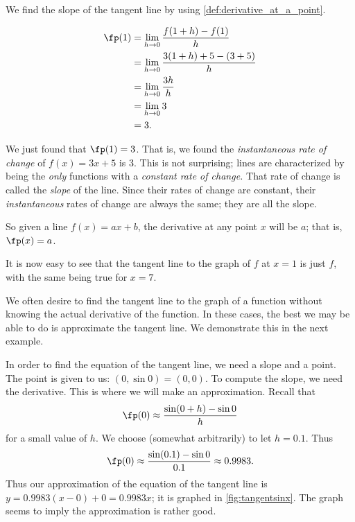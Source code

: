 {We find the slope of the tangent line by using \autoref{def:derivative_at_a_point}.

	\begin{align*}
	\fp(1) &=	\lim_{h\to 0}\frac{f(1+h)-f(1)}{h} \\
					&=	\lim_{h\to 0} \frac{3(1+h)+5 - (3+5)}{h}\\
					&=	\lim_{h\to 0} \frac{3h}{h}\\
					&=	\lim_{h\to 0} 3\\
					&= 3.
	\end{align*}
	
We just found that $\fp(1) = 3$. That is, we found the \textit{instantaneous rate of change} of $f(x) = 3x+5$ is $3$. This is not surprising; lines are characterized by being the \textit{only} functions with a \textit{constant rate of change.} That rate of change is called the \textit{slope} of the line. Since their rates of change are constant, their \textit{instantaneous} rates of  change are always the same; they are all the slope.

So given a line $f(x) = ax+b$, the derivative at any point $x$ will be $a$; that is, $\fp(x) = a$. 

It is now easy to see that the tangent line to the graph of $f$ at $x=1$ is just $f$, with the same being true for $x=7$.}

We often desire to find the tangent line to the graph of a function without knowing the actual derivative of the function. In these cases, the best we may be able to do is approximate the tangent line. We demonstrate this in the next example.\\

{In order to find the equation of the tangent line, we need a slope and a point. The point is given to us: $(0,\sin 0) = (0,0)$. To compute the slope, we need the derivative. This is where we will make an approximation. Recall that $$\fp(0) \approx \frac{\sin(0+h)- \sin 0}{h}$$ for a small value of $h$. We choose (somewhat arbitrarily) to let $h=0.1$. Thus $$\fp(0) \approx \frac{\sin(0.1)-\sin 0}{0.1} \approx 0.9983.$$
Thus our approximation of the equation of the tangent line is $y = 0.9983(x-0) +0 = 0.9983x$; it is graphed in \autoref{fig:tangentsinx}. The graph seems to imply the approximation is rather good.}

